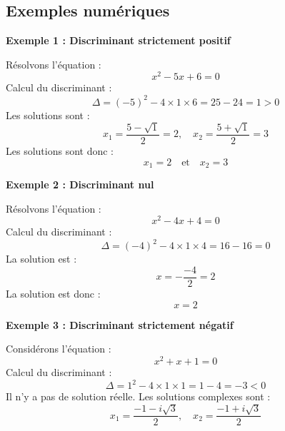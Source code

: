 \documentclass{article}
\begin{document}
\subsection{Exemples numériques}

\textbf{Exemple 1 : Discriminant strictement positif}

Résolvons l'équation :
$$ x^2 - 5x + 6 = 0 $$
Calcul du discriminant :
$$ \Delta = (-5)^2 - 4 \times 1 \times 6 = 25 - 24 = 1 > 0 $$
Les solutions sont :
$$ x_1 = \frac{5 - \sqrt{1}}{2} = 2, \quad x_2 = \frac{5 + \sqrt{1}}{2} = 3 $$
Les solutions sont donc :
$$ \boxed{x_1 = 2} \quad \text{et} \quad \boxed{x_2 = 3} $$

\textbf{Exemple 2 : Discriminant nul}

Résolvons l'équation :
$$ x^2 - 4x + 4 = 0 $$
Calcul du discriminant :
$$ \Delta = (-4)^2 - 4 \times 1 \times 4 = 16 - 16 = 0 $$
La solution est :
$$ x = -\frac{-4}{2} = 2 $$
La solution est donc :
$$ \boxed{x = 2} $$

\textbf{Exemple 3 : Discriminant strictement négatif}

Considérons l'équation :
$$ x^2 + x + 1 = 0 $$
Calcul du discriminant :
$$ \Delta = 1^2 - 4 \times 1 \times 1 = 1 - 4 = -3 < 0 $$
Il n'y a pas de solution réelle. Les solutions complexes sont :
$$ x_1 = \frac{-1 - i\sqrt{3}}{2}, \quad x_2 = \frac{-1 + i\sqrt{3}}{2} $$
\end{document}

